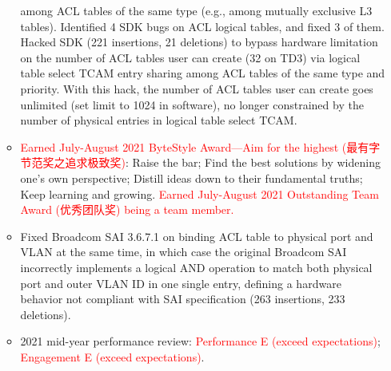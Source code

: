 \documentclass[letterpaper,11pt]{article}
\newcommand{\resitem}[1]{\item #1 \vspace{-2pt}}
\begin{document}
\begin{CJK}{UTF8}{gbsn}
\begin{itemize}
\begin{itemize}
{  among ACL tables of the same type (e.g., among mutually exclusive L3 tables).
  Identified 4 SDK bugs on ACL logical tables, and fixed 3 of them.
  Hacked SDK (221 insertions, 21 deletions) to bypass hardware limitation on the number of ACL tables user can create (32 on TD3)
  via logical table select TCAM entry sharing among ACL tables of the same type and priority.
  With this hack, the number of ACL tables user can create goes unlimited (set limit to 1024 in software),
  no longer constrained by the number of physical entries in logical table select TCAM.}
  \resitem{\textcolor{Red}{Earned July-August 2021 ByteStyle Award---Aim for the highest (最有字节范奖之追求极致奖)}:
  Raise the bar; Find the best solutions by widening one's own perspective; Distill ideas down to their fundamental truths;
  Keep learning and growing.
  \textcolor{Red}{Earned July-August 2021 Outstanding Team Award (优秀团队奖) being a team member.}}
  \resitem{Fixed Broadcom SAI 3.6.7.1 on binding ACL table to physical port and VLAN at the same time,
  in which case the original Broadcom SAI incorrectly implements a logical AND operation to match both physical port and outer VLAN ID in one single entry,
  defining a hardware behavior not compliant with SAI specification (263 insertions, 233 deletions).}
  \resitem{2021 mid-year performance review: \textcolor{Red}{Performance E (exceed expectations)}; \textcolor{Red}{Engagement E (exceed expectations)}.}


\end{itemize}
\end{itemize}
\end{CJK}
\end{document}
